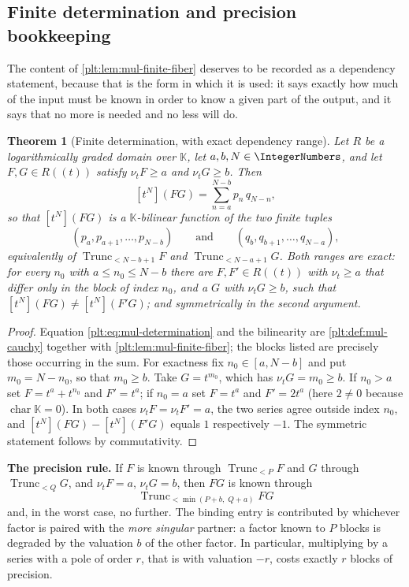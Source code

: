 \documentclass[11pt,oneside]{article}
\theoremstyle{plain}
\newtheorem{theorem}{Theorem}[section]
\theoremstyle{definition}
\theoremstyle{remark}
\newcommand{\K}{\mathbb{K}}
\newcommand{\ordt}{\nu_{t}}                              %
\newcommand{\Trunc}[2]{\operatorname{Trunc}_{<#2}#1}     %
\begin{document}
\subsection{Finite determination and precision bookkeeping}
\label{plt:sec:mul-finite-det}

The content of \cref{plt:lem:mul-finite-fiber} deserves to be recorded as a
dependency statement, because that is the form in which it is used: it says
exactly how much of the input must be known in order to know a given part of
the output, and it says that no more is needed and no less will do.

\begin{theorem}[Finite determination, with exact dependency range]
\label{plt:thm:mul-finite-determination}
Let $R$ be a logarithmically graded domain over $\K$, let $a,b,N\in
\IntegerNumbers$, and let $F,G\in R((t))$ satisfy $\ordt F\ge a$ and
$\ordt G\ge b$.  Then
\begin{equation}\label{plt:eq:mul-determination}
 [t^N](FG)=\sum_{n=a}^{N-b}p_n\,q_{N-n},
\end{equation}
so that $[t^N](FG)$ is a $\K$-bilinear function of the two finite tuples
\[
 (p_a,p_{a+1},\ldots,p_{N-b})
 \qquad\text{and}\qquad
 (q_b,q_{b+1},\ldots,q_{N-a}),
\]
equivalently of $\Trunc{F}{N-b+1}$ and $\Trunc{G}{N-a+1}$.  Both ranges are
exact: for every $n_0$ with $a\le n_0\le N-b$ there are $F,F'\in R((t))$ with
$\ordt\ge a$ that differ only in the block of index $n_0$, and a $G$ with
$\ordt G\ge b$, such that $[t^N](FG)\ne[t^N](F'G)$; and symmetrically in the
second argument.
\end{theorem}

\begin{proof}
Equation \eqref{plt:eq:mul-determination} and the bilinearity are
\cref{plt:def:mul-cauchy} together with \cref{plt:lem:mul-finite-fiber}; the
blocks listed are precisely those occurring in the sum.  For exactness fix
$n_0\in[a,N-b]$ and put $m_0=N-n_0$, so that $m_0\ge b$.  Take
$G=t^{m_0}$, which has $\ordt G=m_0\ge b$.  If $n_0>a$ set $F=t^a+t^{n_0}$
and $F'=t^a$; if $n_0=a$ set $F=t^a$ and $F'=2t^a$ (here $2\ne0$ because
$\operatorname{char}\K=0$).  In both cases $\ordt F=\ordt F'=a$, the two
series agree outside index $n_0$, and $[t^N](FG)-[t^N](F'G)$ equals $1$
respectively $-1$.  The symmetric statement follows by commutativity.
\end{proof}

\begin{checkpointbox}
\textbf{The precision rule.}  If $F$ is known through $\Trunc{F}{P}$ and $G$
through $\Trunc{G}{Q}$, and $\ordt F=a$, $\ordt G=b$, then $FG$ is known
through
\[
 \Trunc{FG}{\min(P+b,\;Q+a)}
\]
and, in the worst case, no further.  The binding entry is contributed by
whichever factor is paired with the \emph{more singular} partner: a factor
known to $P$ blocks is degraded by the valuation $b$ of the other factor.  In
particular, multiplying by a series with a pole of order $r$, that is with
valuation $-r$, costs exactly $r$ blocks of precision.
\end{checkpointbox}
\end{document}
